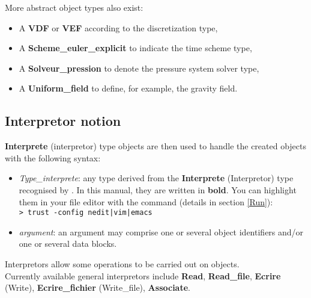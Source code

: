 More abstract object types also exist:

\begin{itemize}
\item A \textbf{VDF} or \textbf{VEF} according to the discretization type,
\item A \textbf{Scheme\_euler\_explicit} to indicate the time scheme type,
\item A \textbf{Solveur\_pression} to denote the pressure system solver type,
\item A \textbf{Uniform\_field} to define, for example, the gravity field.
\end{itemize}



\subsection{Interpretor notion}
\textbf{Interprete } (interpretor) type objects are then used to handle the created objects with the following syntax:
    \begin{center}
    \end{center}

\begin{itemize}
\item \textit{Type\_interprete}: any type derived from the \textbf{Interprete} (Interpretor) type recognised by \trust. In this manual, they are written in \textbf{bold}. You can highlight them in your file editor with the command (details in section \ref{Run}):\\
\texttt{> trust -config nedit|vim|emacs}
\item \textit{argument}: an argument may comprise one or several object identifiers and/or one or several data blocks.
\end{itemize}

Interpretors allow some operations to be carried out on objects.\\

Currently available general interpretors include \textbf{Read}, \textbf{Read\_file}, \textbf{Ecrire} (Write), \textbf{Ecrire\_fichier} (Write\_file), \textbf{Associate}.



